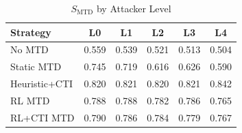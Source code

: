 \begin{table}[!t]
\centering
\caption{$S_{\mathrm{MTD}}$ by Attacker Level}
\begin{tabular}{lccccc}
\toprule
\textbf{Strategy} & \textbf{L0} & \textbf{L1} & \textbf{L2} & \textbf{L3} & \textbf{L4} \\
\midrule
No MTD & 0.559 & 0.539 & 0.521 & 0.513 & 0.504 \\
Static MTD & 0.745 & 0.719 & 0.616 & 0.626 & 0.590 \\
Heuristic+CTI & 0.820 & 0.821 & 0.820 & 0.821 & 0.842 \\
RL MTD & 0.788 & 0.788 & 0.782 & 0.786 & 0.765 \\
RL+CTI MTD & 0.790 & 0.786 & 0.784 & 0.779 & 0.767 \\
\bottomrule
\end{tabular}
\end{table}

